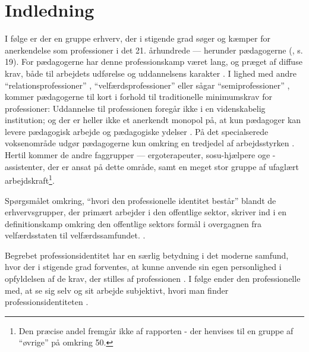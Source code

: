 \section{Indledning}

I følge \citeauthor{hansbolKonstruktionAfProfessionel2008} er der en gruppe erhverv, der i stigende grad søger og kæmper for anerkendelse som professioner i det 21. århundrede — herunder pædagogerne (\citeyear{hansbolKonstruktionAfProfessionel2008}, s. 19).
For pædagogerne har denne professionskamp været lang, og præget af diffuse krav, både til arbejdets udførelse og uddannelsens karakter \autocite[ss. 48-51] {kofodBornepolitikkenOgUdviklingen2007}.
I lighed med andre “relationsprofessioner” \autocite{moosRelationsprofessionerLaererePaedagoger2008}, “velfærdsprofessioner” \autocite{frederiksenVelfaerdsprofessionerMellemOmsorg2017} eller sågar “semiprofessioner”\autocite{kofodBornepolitikkenOgUdviklingen2007} , kommer pædagogerne til kort i forhold til traditionelle minimumskrav for professioner:
Uddannelse til professionen foregår ikke i en videnskabelig institution; og der er heller ikke et anerkendt monopol på, at kun pædagoger kan levere pædagogisk arbejde og pædagogiske ydelser \autocite[s.53]{kofodBornepolitikkenOgUdviklingen2007}.
På det specialserede voksenområde udgør pædagogerne kun omkring en tredjedel af arbejdsstyrken \autocite[ss. 8-9]{kommunerneslandsforeningFaktaOmKommunernes2019}.
Hertil kommer de andre faggrupper — ergoterapeuter, sosu-hjælpere oge -assistenter, der er ansat på dette område, samt en meget stor gruppe af ufaglært arbejdskraft\footnote{Den præcise andel fremgår ikke af rapporten - der henvises til en gruppe af “øvrige” på omkring 50\percent \autocite[s. 8]{kommunerneslandsforeningFaktaOmKommunernes2019}.}.

Spørgsmålet omkring, “hvori den professionelle identitet består” blandt de erhvervsgrupper, der primært arbejder i den offentlige sektor, skriver \citeauthor{hansbolKonstruktionAfProfessionel2008} ind i en definitionskamp omkring den offentlige sektors formål i overgagnen fra velfærdsstaten til velfærdssamfundet.
\autocite[s. 19]{hansbolKonstruktionAfProfessionel2008}.

Begrebet professionsidentitet har en særlig betydning i det moderne samfund, hvor der i stigende grad forventes, at kunne anvende sin egen personlighed i opfyldelsen af de krav, der stilles af professionen \autocite{hansbolKonstruktionAfProfessionel2008}. I følge \citeauthor{mik-meyerIndledningSkabeProfessionel2012} ender den professionelle med, at se sig selv og sit arbejde subjektivt, hvori man finder professionsidentiteten \autocite[s. 458]{mik-meyerIndledningSkabeProfessionel2012}.

